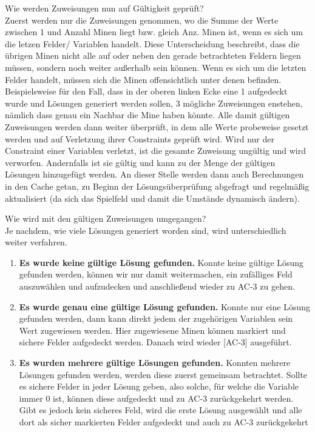 Wie werden Zuweisungen nun auf Gültigkeit geprüft?\\
Zuerst werden nur die Zuweisungen genommen, wo die Summe der Werte zwischen 1 und Anzahl Minen liegt bzw. gleich Anz. Minen ist, wenn es
sich um die letzen Felder/ Variablen handelt. Diese Unterscheidung beschreibt, dass die übrigen Minen nicht alle auf oder neben den gerade
betrachteten Feldern liegen müssen, sondern noch weiter außerhalb sein können. Wenn es sich um die letzten Felder handelt, müssen sich die
Minen offensichtlich unter denen befinden. Beispielsweise für den Fall, dass in der oberen linken Ecke eine 1 aufgedeckt wurde und Lösungen
generiert werden sollen, 3 mögliche Zuweisungen enstehen, nämlich dass genau ein Nachbar die Mine haben könnte.
Alle damit gültigen Zuweisungen werden dann weiter überprüft, in dem alle Werte probeweise gesetzt werden und auf Verletzung ihrer Constraints
geprüft wird. Wird nur der Constraint einer Variablen verletzt, ist die gesamte Zuweisung ungültig und wird verworfen. Andernfalls ist sie
gültig und kann zu der Menge der gültigen Lösungen hinzugefügt werden. An dieser Stelle werden dann auch Berechnungen in den Cache getan, 
zu Beginn der Lösungsüberprüfung abgefragt und regelmäßig aktualisiert (da sich das Spielfeld und damit die Umstände dynamisch ändern).

Wie wird mit den gültigen Zuweisungen umgegangen?\\
Je nachdem, wie viele Lösungen generiert worden sind, wird unterschiedlich weiter verfahren.
\begin{enumerate}
    \item \textbf{Es wurde keine gültige Lösung gefunden.} Konnte keine gültige Lösung gefunden werden, können wir nur damit weitermachen,
    ein zufälliges Feld auszuwählen und aufzudecken und anschließend wieder zu AC-3 zu gehen.
    \item \textbf{Es wurde genau eine gültige Lösung gefunden.} Konnte nur eine Lösung gefunden werden, dann kann direkt jedem der zugehörigen
    Variablen sein Wert zugewiesen werden. Hier zugewiesene Minen können markiert und sichere Felder aufgedeckt werden. Danach wird wieder
    [AC-3] ausgeführt. 
    \item \textbf{Es wurden mehrere gültige Lösungen gefunden.} Konnten mehrere Lösungen gefunden werden, werden diese zuerst gemeinsam betrachtet.
    Sollte es sichere Felder in jeder Lösung geben, also solche, für welche die Variable immer 0 ist, können diese aufgedeckt und zu AC-3
    zurückgekehrt werden. Gibt es jedoch kein sicheres Feld, wird die erste Lösung ausgewählt und alle dort als sicher markierten Felder
    aufgedeckt und auch zu AC-3 zurückgekehrt
\end{enumerate}

